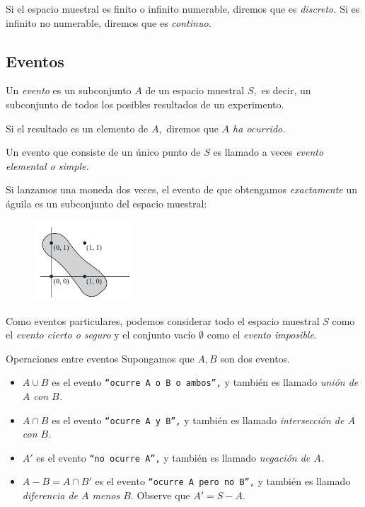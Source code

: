 {}
Si el espacio muestral es finito o infinito numerable, diremos que es \emph{discreto.}  Si es infinito no numerable, diremos que es \emph{continuo.}

\subsection{Eventos}
{}
Un \emph{evento} es un subconjunto $A$ de un espacio muestral $S,$ es decir, un subconjunto de todos los posibles resultados de un experimento. 

Si el resultado es un elemento de $A,$ diremos que \emph{$A$ ha ocurrido.} 

Un evento que consiste de un único punto de $S$ es llamado a veces \emph{evento elemental o simple.}

{}
\begin{ejemplo}
 \label{exmp:1.8}
 Si lanzamos una moneda dos veces, el evento de que obtengamos \emph{exactamente} un águila  es un subconjunto del espacio muestral:
 
 \begin{figure}[h]
 \centering
 \includegraphics[height=3cm,keepaspectratio=true]{./pe/pands0102.png}
 \label{pands0102}
\end{figure}

\end{ejemplo}


{}
Como eventos particulares, podemos considerar todo el espacio muestral $S$ como el \emph{evento cierto o seguro} y el conjunto vacío $\emptyset$ como el \emph{evento imposible.}


{Operaciones entre eventos} Supongamos que $A,B$ son dos eventos. 
\begin{itemize}
 \item $A\cup B$ es el evento \texttt{``ocurre $A$ o $B$ o ambos'',} y también es llamado \emph{unión de $A$ con $B$.}  
 \item $A\cap B$ es el evento \texttt{``ocurre $A$ y $B$'',} y también es llamado \emph{intersección de $A$ con $B$.}  
 \item $A'$ es el evento \texttt{``no ocurre $A$'',} y también es llamado \emph{negación de $A$.} 
 \item $A-B=A\cap B'$ es el evento \texttt{``ocurre $A$ pero no $B$'',} y también es llamado \emph{diferencia de $A$ menos $B.$}  Observe que
 $A' = S - A.$
\end{itemize}

